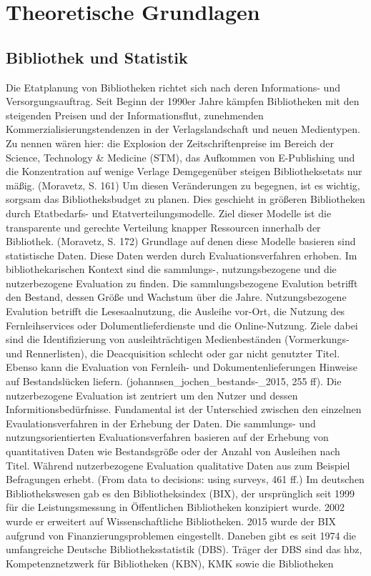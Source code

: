 \chapter{Theoretische Grundlagen}
\label{chap:two}
\section{Bibliothek und Statistik}
\label{chap:two_one}
Die Etatplanung von Bibliotheken richtet sich nach deren Informations- und Versorgungsauftrag. 
Seit Beginn der 1990er Jahre kämpfen Bibliotheken mit den steigenden Preisen und der Informationsflut,
zunehmenden Kommerzialisierungstendenzen in der Verlagslandschaft und neuen Medientypen. 
Zu nennen wären hier: die Explosion der Zeitschriftenpreise im Bereich der Science, Technology & Medicine (STM),
das Aufkommen von E-Publishing und die Konzentration auf wenige Verlage Demgegenüber steigen Bibliotheksetats nur mäßig. (Moravetz, S. 161)
Um diesen Veränderungen zu begegnen, ist es wichtig, sorgsam das Bibliotheksbudget zu planen. Dies geschieht in größeren Bibliotheken 
durch Etatbedarfs- und Etatverteilungsmodelle. Ziel dieser Modelle ist die transparente und gerechte Verteilung knapper Ressourcen innerhalb der Bibliothek. (Moravetz, S. 172) Grundlage auf denen diese Modelle basieren sind statistische Daten. Diese Daten werden durch Evaluationsverfahren erhoben. 
Im bibliothekarischen Kontext sind die sammlungs-, nutzungsbezogene und die nutzerbezogene Evaluation zu finden.  Die sammlungsbezogene Evalution betrifft den Bestand, dessen Größe und Wachstum über die Jahre. Nutzungsbezogene Evalution betrifft die Lesesaalnutzung, die Ausleihe vor-Ort, die Nutzung des Fernleihservices oder Dolumentlieferdienste und die Online-Nutzung. Ziele dabei sind die Identifizierung von ausleihträchtigen Medienbeständen (Vormerkungs- und Rennerlisten), die Deacquisition schlecht oder gar nicht genutzter Titel. Ebenso kann die Evaluation von Fernleih- und Dokumentenlieferungen Hinweise auf Bestandslücken liefern. (johannsen_jochen_bestands-_2015, 255 ff). Die nutzerbezogene Evaluation ist zentriert um den Nutzer und dessen Informitionsbedürfnisse.
Fundamental ist der Unterschied zwischen den einzelnen Evaulationsverfahren in der Erhebung der Daten. Die sammlungs- und nutzungsorientierten Evaluationsverfahren basieren auf der Erhebung von quantitativen Daten wie Bestandsgröße oder der Anzahl von Ausleihen nach Titel. Während nutzerbezogene Evaluation qualitative Daten aus zum Beispiel Befragungen erhebt. (From data to decisions: using surveys, 461 ff.)
Im deutschen Bibliothekswesen gab es den Bibliotheksindex (BIX), der ursprünglich seit 1999 für die Leistungsmessung in Öffentlichen Bibliotheken konzipiert wurde. 2002 wurde er erweitert auf Wissenschaftliche Bibliotheken. 2015 wurde der BIX aufgrund von Finanzierungsproblemen eingestellt. Daneben gibt es seit 1974 die umfangreiche Deutsche Bibliotheksstatistik (DBS). Träger der DBS sind das hbz, Kompetenznetzwerk für Bibliotheken (KBN), KMK sowie die Bibliotheken
